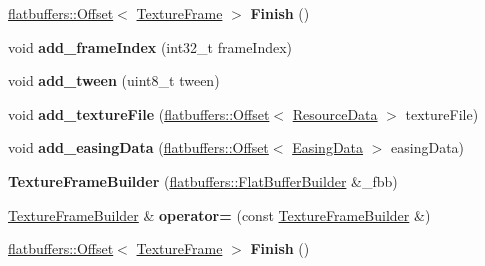 \begin{DoxyCompactItemize}
\hyperlink{structflatbuffers_1_1Offset}{flatbuffers\+::\+Offset}$<$ \hyperlink{structflatbuffers_1_1TextureFrame}{Texture\+Frame} $>$ {\bfseries Finish} ()
\item 
\mbox{\label{structflatbuffers_1_1TextureFrameBuilder_a83f3b133ff9a17ab456104d33a8e8110}} 
void {\bfseries add\+\_\+frame\+Index} (int32\+\_\+t frame\+Index)
\item 
\mbox{\label{structflatbuffers_1_1TextureFrameBuilder_a345a373fd03ad7f14369e692b888d53f}} 
void {\bfseries add\+\_\+tween} (uint8\+\_\+t tween)
\item 
\mbox{\label{structflatbuffers_1_1TextureFrameBuilder_a023f96a19e0b1d480e40868ab6450659}} 
void {\bfseries add\+\_\+texture\+File} (\hyperlink{structflatbuffers_1_1Offset}{flatbuffers\+::\+Offset}$<$ \hyperlink{structflatbuffers_1_1ResourceData}{Resource\+Data} $>$ texture\+File)
\item 
\mbox{\label{structflatbuffers_1_1TextureFrameBuilder_aa0c2de35768aca74c8da18b457f60594}} 
void {\bfseries add\+\_\+easing\+Data} (\hyperlink{structflatbuffers_1_1Offset}{flatbuffers\+::\+Offset}$<$ \hyperlink{structflatbuffers_1_1EasingData}{Easing\+Data} $>$ easing\+Data)
\item 
\mbox{\label{structflatbuffers_1_1TextureFrameBuilder_a7a61c26c480bdfe34d8252737ea9f01b}} 
{\bfseries Texture\+Frame\+Builder} (\hyperlink{classflatbuffers_1_1FlatBufferBuilder}{flatbuffers\+::\+Flat\+Buffer\+Builder} \&\+\_\+fbb)
\item 
\mbox{\label{structflatbuffers_1_1TextureFrameBuilder_a817806a6def203d60e02d165a1d93383}} 
\hyperlink{structflatbuffers_1_1TextureFrameBuilder}{Texture\+Frame\+Builder} \& {\bfseries operator=} (const \hyperlink{structflatbuffers_1_1TextureFrameBuilder}{Texture\+Frame\+Builder} \&)
\item 
\mbox{\label{structflatbuffers_1_1TextureFrameBuilder_aa0eb48b45d9cf909145aea208299e24c}} 
\hyperlink{structflatbuffers_1_1Offset}{flatbuffers\+::\+Offset}$<$ \hyperlink{structflatbuffers_1_1TextureFrame}{Texture\+Frame} $>$ {\bfseries Finish} ()
\end{DoxyCompactItemize}
